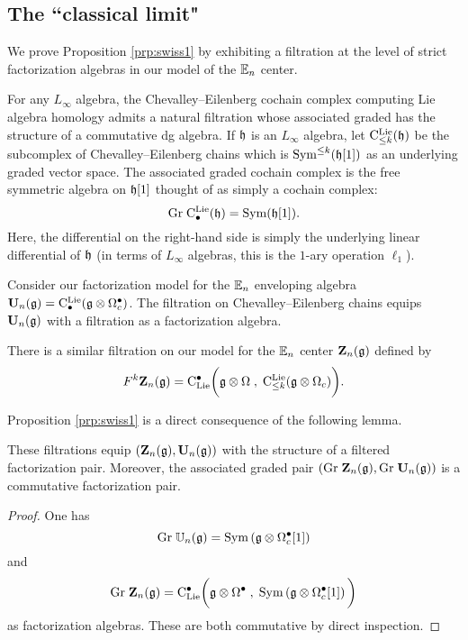 \documentclass[11pt]{amsart}
\numberwithin{equation}{section}
\begin{document}

\subsection{The ``classical limit"}

We prove Proposition \ref{prp:swiss1} by exhibiting a filtration at the level of strict factorization algebras in our model of the $\mathbb E_n$ center. 

For any $L_\infty$ algebra, the Chevalley--Eilenberg cochain complex computing Lie algebra homology admits a natural filtration whose associated graded has the structure of a commutative dg algebra.
If $\mathfrak h$ is an $L_\infty$ algebra, let ${\rm C}^{\rm Lie}_{\leq k} (\mathfrak h)$ be the subcomplex of Chevalley--Eilenberg chains which is ${\rm Sym}^{\leq k} (\mathfrak h[1])$ as an underlying graded vector space. 
The associated graded cochain complex is the free symmetric algebra on $\mathfrak h[1]$ thought of as simply a cochain complex:
\[
{\rm Gr} \; {\rm C}^{\rm Lie}_\bullet (\mathfrak h) = {\rm Sym} (\mathfrak h [1])  .
\]
Here, the differential on the right-hand side is simply the underlying linear differential of $\mathfrak h$ (in terms of $L_\infty$ algebras, this is the $1$-ary operation $\ell_1$). 

Consider our factorization model for the $\mathbb E_n$ enveloping algebra $\mathbf U_n(\mathfrak g) = {\rm C}^{\rm Lie}_\bullet (\mathfrak g \otimes \Omega^\bullet_c)$. 
The filtration on Chevalley--Eilenberg chains equips $\mathbf U_n(\mathfrak g)$ with a filtration as a factorization algebra. 

There is a similar filtration on our model for the $\mathbb E_n$ center $\mathbf Z_n(\mathfrak g)$ defined by
\[
F^k \mathbf Z_n(\mathfrak g) = {\rm C}_{\rm Lie}^\bullet \bigg(\mathfrak g \otimes \Omega \; , \; {\rm C}^{\rm Lie}_{\leq k} (\mathfrak g \otimes \Omega_c) \bigg) .
\]

Proposition \ref{prp:swiss1} is a direct consequence of the following lemma.

\begin{lmm}
These filtrations equip $(\mathbf Z_n (\mathfrak g), \mathbf U_n(\mathfrak g))$ with the structure of a filtered factorization pair.
Moreover, the associated graded pair $({\rm Gr} \; \mathbf Z_n (\mathfrak g), {\rm Gr} \; \mathbf U_n(\mathfrak g))$ is a commutative factorization pair. 
\end{lmm}
\begin{proof}
One has
\[
{\rm Gr} \; \mathbb U_n (\mathfrak g) = {\rm Sym} \left(\mathfrak g \otimes \Omega^\bullet_c [1] \right)
\]
and
\[
{\rm Gr} \; \mathbf Z_n (\mathfrak g) = {\rm C}_{{\rm Lie}}^\bullet\bigg(\mathfrak g \otimes \Omega^\bullet \; , \; {\rm Sym} \left(\mathfrak g \otimes \Omega^\bullet_c [1]\right) \bigg) 
\]
as factorization algebras. 
These are both commutative by direct inspection. 
\end{proof}
\end{document}
